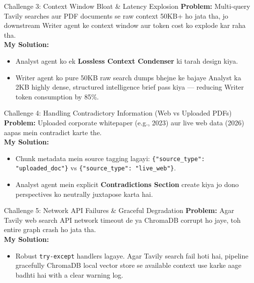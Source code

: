 \documentclass[9.5pt, a4paper]{article}
\begin{document}
\begin{interviewbox}{Challenge 3: Context Window Bloat \& Latency Explosion}
\textbf{Problem:} Multi-query Tavily searches aur PDF documents se raw context 50KB+ ho jata tha, jo downstream Writer agent ke context window aur token cost ko explode kar raha tha.\\
\textbf{My Solution:}
\begin{itemize}
    \item Analyst agent ko ek \textbf{Lossless Context Condenser} ki tarah design kiya.
    \item Writer agent ko pure 50KB raw search dumps bhejne ke bajaye Analyst ka 2KB highly dense, structured intelligence brief pass kiya — reducing Writer token consumption by 85\%.
\end{itemize}
\end{interviewbox}

\begin{interviewbox}{Challenge 4: Handling Contradictory Information (Web vs Uploaded PDFs)}
\textbf{Problem:} Uploaded corporate whitepaper (e.g., 2023) aur live web data (2026) aapas mein contradict karte the.\\
\textbf{My Solution:}
\begin{itemize}
    \item Chunk metadata mein source tagging lagayi: \texttt{\{"source\_type": "uploaded\_doc"\}} vs \texttt{\{"source\_type": "live\_web"\}}.
    \item Analyst agent mein explicit \textbf{Contradictions Section} create kiya jo dono perspectives ko neutrally juxtapose karta hai.
\end{itemize}
\end{interviewbox}

\begin{interviewbox}{Challenge 5: Network API Failures \& Graceful Degradation}
\textbf{Problem:} Agar Tavily web search API network timeout de ya ChromaDB corrupt ho jaye, toh entire graph crash ho jata tha.\\
\textbf{My Solution:}
\begin{itemize}
    \item Robust \texttt{try-except} handlers lagaye. Agar Tavily search fail hoti hai, pipeline gracefully ChromaDB local vector store se available context use karke aage badhti hai with a clear warning log.
\end{itemize}
\end{interviewbox}

\clearpage
\end{document}
